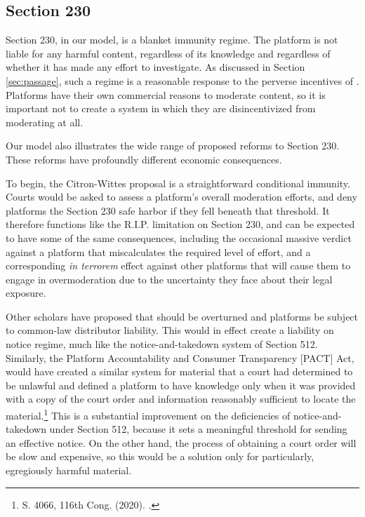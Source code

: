 \subsection{Section 230}

Section 230, in our model, is a blanket immunity regime. The platform is not liable for any harmful content, regardless of its knowledge and regardless of whether it has made any effort to investigate. As discussed in Section \ref{sec:passage}, such a regime is a reasonable response to the perverse incentives of . Platforms have their own commercial reasons to moderate content, so it is important not to create a system in which they are disincentivized from moderating at all.

Our model also illustrates the wide range of proposed reforms to Section 230. These reforms have profoundly different economic consequences.

To begin, the Citron-Wittes proposal is a straightforward conditional immunity. Courts would be asked to assess a platform's overall moderation efforts, and deny platforms the Section 230 safe harbor if they fell beneath that threshold. It therefore functions like the R.I.P. limitation on Section 230, and can be expected to have some of the same consequences, including the occasional massive verdict against a platform that miscalculates the required level of effort, and a corresponding \emph{in terrorem} effect against other platforms that will cause them to engage in overmoderation due to the uncertainty they face about their legal exposure.

Other scholars have proposed that  should be overturned and platforms be subject to common-law distributor liability. This would in effect create a liability on notice regime, much like the notice-and-takedown system of Section 512. Similarly, the Platform Accountability and Consumer Transparency [PACT] Act, would have created a similar system for material that a court had determined to be unlawful and defined a platform to have knowledge only when it was provided with a copy of the court order and information reasonably sufficient to locate the material.\footnote{S. 4066, 116th Cong. (2020). .} This is a substantial improvement on the deficiencies of notice-and-takedown under Section 512, because it sets a meaningful threshold for sending an effective notice. On the other hand, the process of obtaining a court order will be slow and expensive, so this would be a solution only for particularly, egregiously harmful material.


